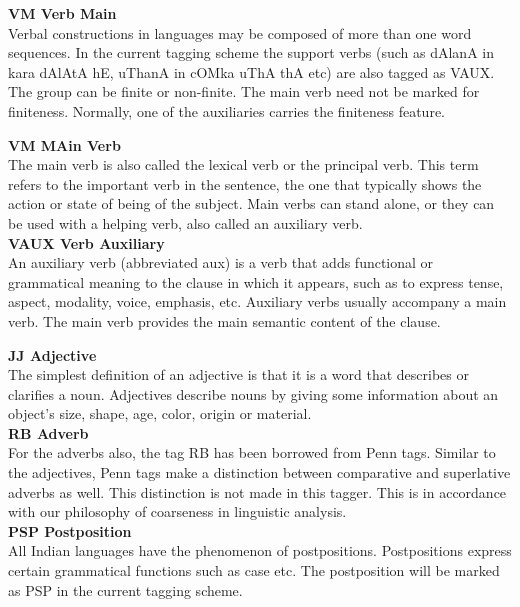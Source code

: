 \documentclass[12pt,a4paper,oneside]{memoir}
\begin{document}
\textbf{VM Verb Main }\\

Verbal constructions in languages may be composed of more than one word
sequences. In the current tagging scheme the
support verbs (such as dAlanA in kara dAlAtA hE, uThanA in cOMka uThA thA
etc) are also tagged as VAUX. The group can be finite or non-finite. The main 
verb need not be marked for finiteness. Normally, one of the auxiliaries carries
the finiteness feature. 

\textbf{VM MAin Verb}\\

The main verb is also called the lexical verb or the principal verb. This term refers to the important verb in the sentence, the one that typically shows the action or state of being of the subject. Main verbs can stand alone, or they can be used with a helping verb, also called an auxiliary verb.\\

\textbf{VAUX Verb Auxiliary}\\
An auxiliary verb (abbreviated aux) is a verb that adds functional or grammatical meaning to the clause in which it appears, such as to express tense, aspect, modality, voice, emphasis, etc. Auxiliary verbs usually accompany a main verb. The main verb provides the main semantic content of the clause.

\textbf{JJ Adjective }\\

The simplest definition of an adjective is that it is a word that describes or clarifies a noun. Adjectives describe nouns by giving some information about an object's size, shape, age, color, origin or material.\\

\textbf{RB Adverb }\\

For the adverbs also, the tag RB has been borrowed from Penn tags. Similar to
the adjectives, Penn tags make a distinction between comparative and
superlative adverbs as well. This distinction is not made in this tagger. This is
in accordance with our philosophy of coarseness in linguistic analysis. \\

\textbf{PSP Postposition }\\

All Indian languages have the phenomenon of postpositions. Postpositions
express certain grammatical functions such as case etc. The postposition will be
marked as PSP in the current tagging scheme.\\
\end{document}
